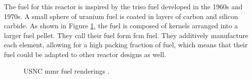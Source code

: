 The fuel for this reactor is inspired by the \gls{triso} fuel developed in the 1960s and 1970s. A small sphere of uranium fuel is coated in layers of carbon and silicon carbide. As shown in Figure \ref{fig:usnc_fuel}, the fuel is composed of kernels arranged into a larger fuel pellet. They call their fuel form \gls{fcm} fuel. They additively manufacture each element, allowing for a high packing fraction of fuel, which means that their fuel could be adapted to other reactor designs as well.

\begin{figure}[H]
    \hfill
    \caption{
    USNC \gls{mmr} fuel renderings
      \cite{usnc_media_kit}.}
    \label{fig:usnc_fuel}
\end{figure}

